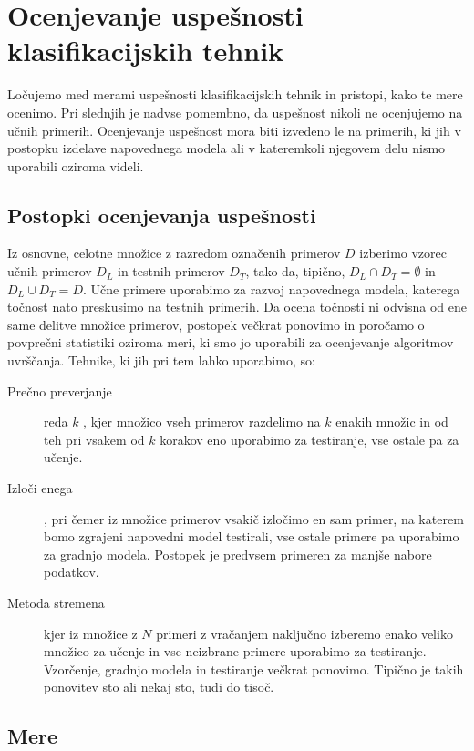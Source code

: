 \section{Ocenjevanje uspešnosti klasifikacijskih tehnik}

Ločujemo med merami uspešnosti klasifikacijskih tehnik in pristopi, kako te mere ocenimo. Pri slednjih je nadvse pomembno, da uspešnost nikoli ne ocenjujemo na učnih primerih. Ocenjevanje uspešnost mora biti izvedeno le na primerih, ki jih v postopku izdelave napovednega modela ali v kateremkoli njegovem delu nismo uporabili oziroma videli.

\subsection{Postopki ocenjevanja uspešnosti}

Iz osnovne, celotne množice z razredom označenih primerov $D$ izberimo vzorec učnih primerov $D_L$ in testnih primerov $D_T$, tako da, tipično, $D_L\cap D_T=\emptyset$ in $D_L\cup D_T=D$. Učne primere uporabimo za razvoj napovednega modela, katerega točnost nato preskusimo na testnih primerih. Da ocena točnosti ni odvisna od ene same delitve množice primerov, postopek večkrat ponovimo in poročamo o povprečni statistiki oziroma meri, ki smo jo uporabili za ocenjevanje algoritmov uvrščanja. Tehnike, ki jih pri tem lahko uporabimo, so:
\begin{description}
\item[Prečno preverjanje] reda $k$ , kjer množico vseh primerov razdelimo na $k$ enakih množic in od teh pri vsakem od $k$ korakov eno uporabimo za testiranje, vse ostale pa za učenje.
\item[Izloči enega] , pri čemer iz množice primerov vsakič izločimo en sam primer, na katerem bomo zgrajeni napovedni model testirali, vse ostale primere pa uporabimo za gradnjo modela. Postopek je predvsem primeren za manjše nabore podatkov.
\item[Metoda stremena]  kjer iz množice z $N$ primeri z vračanjem naključno izberemo enako veliko množico za učenje in vse neizbrane primere uporabimo za testiranje. Vzorčenje, gradnjo modela in testiranje večkrat ponovimo. Tipično je takih ponovitev sto ali nekaj sto, tudi do tisoč.
\end{description}

\subsection{Mere}

